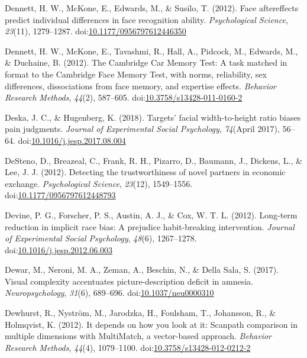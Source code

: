\documentclass[english,man]{apa6}
\theoremstyle{definition}
\theoremstyle{definition}
\theoremstyle{definition}
\theoremstyle{remark}
\begin{document}
\hypertarget{ref-Dennett2012a}{}
Dennett, H. W., McKone, E., Edwards, M., \& Susilo, T. (2012). Face
aftereffects predict individual differences in face recognition ability.
\emph{Psychological Science}, \emph{23}(11), 1279--1287.
doi:\href{https://doi.org/10.1177/0956797612446350}{10.1177/0956797612446350}

\hypertarget{ref-Dennett2012}{}
Dennett, H. W., McKone, E., Tavashmi, R., Hall, A., Pidcock, M.,
Edwards, M., \& Duchaine, B. (2012). The Cambridge Car Memory Test: A
task matched in format to the Cambridge Face Memory Test, with norms,
reliability, sex differences, dissociations from face memory, and
expertise effects. \emph{Behavior Research Methods}, \emph{44}(2),
587--605.
doi:\href{https://doi.org/10.3758/s13428-011-0160-2}{10.3758/s13428-011-0160-2}

\hypertarget{ref-Deska2018}{}
Deska, J. C., \& Hugenberg, K. (2018). Targets' facial width-to-height
ratio biases pain judgments. \emph{Journal of Experimental Social
Psychology}, \emph{74}(April 2017), 56--64.
doi:\href{https://doi.org/10.1016/j.jesp.2017.08.004}{10.1016/j.jesp.2017.08.004}

\hypertarget{ref-DeSteno2012}{}
DeSteno, D., Breazeal, C., Frank, R. H., Pizarro, D., Baumann, J.,
Dickens, L., \& Lee, J. J. (2012). Detecting the trustworthiness of
novel partners in economic exchange. \emph{Psychological Science},
\emph{23}(12), 1549--1556.
doi:\href{https://doi.org/10.1177/0956797612448793}{10.1177/0956797612448793}

\hypertarget{ref-Devine2012}{}
Devine, P. G., Forscher, P. S., Austin, A. J., \& Cox, W. T. L. (2012).
Long-term reduction in implicit race bias: A prejudice habit-breaking
intervention. \emph{Journal of Experimental Social Psychology},
\emph{48}(6), 1267--1278.
doi:\href{https://doi.org/10.1016/j.jesp.2012.06.003}{10.1016/j.jesp.2012.06.003}

\hypertarget{ref-Dewar2017}{}
Dewar, M., Neroni, M. A., Zeman, A., Beschin, N., \& Della Sala, S.
(2017). Visual complexity accentuates picture-description deficit in
amnesia. \emph{Neuropsychology}, \emph{31}(6), 689--696.
doi:\href{https://doi.org/10.1037/neu0000310}{10.1037/neu0000310}

\hypertarget{ref-Dewhurst2012}{}
Dewhurst, R., Nyström, M., Jarodzka, H., Foulsham, T., Johansson, R., \&
Holmqvist, K. (2012). It depends on how you look at it: Scanpath
comparison in multiple dimensions with MultiMatch, a vector-based
approach. \emph{Behavior Research Methods}, \emph{44}(4), 1079--1100.
doi:\href{https://doi.org/10.3758/s13428-012-0212-2}{10.3758/s13428-012-0212-2}
\end{document}

